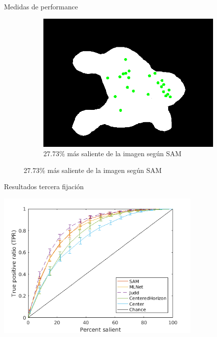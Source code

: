 \documentclass[compress]{beamer}
\begin{document}
\begin{frame}{Medidas de performance}
\begin{figure}[b]
	\hfill
	\begin{subfigure}[t]{0.3\textwidth}
        \centering
        \includegraphics[width=\linewidth]{images/example-salient-percent-27-73.png} 
        \caption{\footnotesize
27.73\% más saliente de la imagen según SAM} \label{fig:example-salient-percent-27-73}
    \end{subfigure}
\end{figure}

\end{frame}


\begin{frame}{Resultados tercera fijación}
\begin{center}
\includegraphics[width=0.75\textwidth]{images/results_fix_3_to_3_all.png} 
\end{center}

\end{frame}
\end{document}
